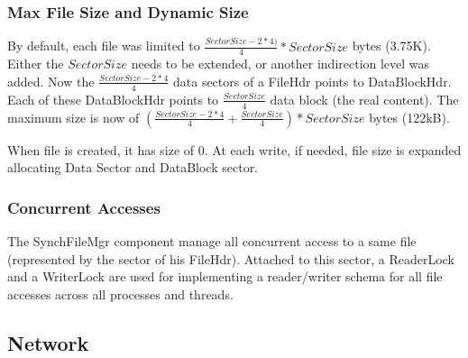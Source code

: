 \subsubsection{Max File Size and Dynamic Size}
By default, each file was limited to $\frac{SectorSize - 2*4)}{4} * SectorSize$
bytes (3.75K). Either the $SectorSize$ needs to be extended, or another
indirection level was added.
Now the $\frac{SectorSize - 2*4}{4}$ data sectors of a FileHdr points to
DataBlockHdr. Each of these DataBlockHdr points to $\frac{SectorSize}{4}$ data
block (the real content).
The maximum size is now of $(\frac{SectorSize - 2*4}{4} +
\frac{SectorSize}{4})*SectorSize$ bytes (122kB).

When file is created, it has size of 0. At each write, if needed, file size is
expanded allocating Data Sector and DataBlock sector.

\subsubsection{Concurrent Accesses}
The SynchFileMgr component manage all concurrent access to a same file
(represented by the sector of his FileHdr). Attached to this sector, a
ReaderLock and a WriterLock are used for implementing a reader/writer schema for
all file accesses across all processes and threads.


\subsection{Network}


